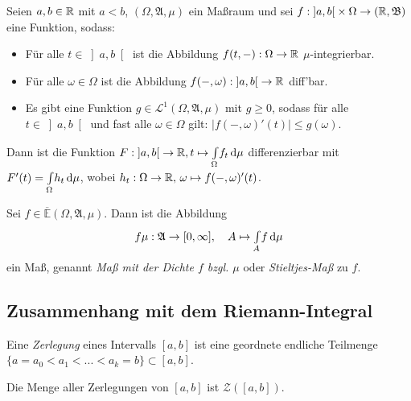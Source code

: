 \documentclass{cheat-sheet}
\newcommand{\Alg}{\mathfrak{A}} %
\newcommand{\Bor}{\mathfrak{B}} %
\newcommand{\E}{\mathbb{E}} %
\newcommand{\Leb}{\mathcal{L}} %
\newcommand{\IntOmu}[1]{\Int{\Omega}{}{#1}{\mu}} %
\begin{document}
\vspace{-20pt}

\begin{satz}
  Seien $a, b \in \mathbb{R}$ mit $a < b$, $(\Omega, \Alg, \mu)$ ein Maßraum und sei $f : \left]a, b\right[ \times \Omega \to (\R, \Bor)$ eine Funktion, sodass:
  \begin{itemize}
    \item Für alle $t \in \left]a, b\right[$ ist die Abbildung $f(t, -) : \Omega \to \mathbb{R}$ $\mu$-integrierbar.
    \item Für alle $\omega \in \Omega$ ist die Abbildung $f(-, \omega) : \left]a, b\right[ \to \mathbb{R}$ diff'bar.
    \item Es gibt eine Funktion $g \in \Leb^1(\Omega, \Alg, \mu)$ mit $g \geq 0$, sodass für alle $t \in \left]a, b\right[$ und fast alle $\omega \in \Omega$ gilt: $\left|f(-, \omega)'(t)\right| \leq g(\omega)$.
  \end{itemize}
  Dann ist die Funktion $F : \left]a, b\right[ \to \R, t \mapsto \IntOmu{f_t}$ differenzierbar mit\\[-3pt]
  $F'(t) = \IntOmu{h_t}$, wobei $h_t : \Omega \to \mathbb{R}, \, \omega \mapsto f(-, \omega)'(t)$.
\end{satz}

\begin{samepage}

\begin{satz}
  Sei $f \in \overline{\E}(\Omega, \Alg, \mu)$. Dann ist die Abbildung
  \[ f \mu : \Alg \to [0, \infty], \quad A \mapsto \Int{A}{}{f}{\mu} \]
  ein Maß, genannt \emph{Maß mit der Dichte $f$ bzgl. $\mu$} oder \emph{Stieltjes-Maß} zu $f$.
\end{satz}

\subsection{Zusammenhang mit dem Riemann-Integral}

\end{samepage}

\begin{defn}
  Eine \emph{Zerlegung} eines Intervalls $[a, b]$ ist eine geordnete endliche Teilmenge $\{ a = a_0 < a_1 < ... < a_k = b\} \subset [a, b]$.
\end{defn}

\begin{nota}
  Die Menge aller Zerlegungen von $[a, b]$ ist $\mathcal{Z}([a, b])$.
\end{nota}
\end{document}
